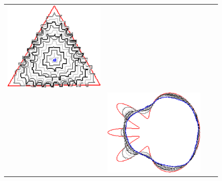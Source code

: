 \begin{figure}
\begin{tabular}{p{2.5em}ccc}
\includegraphics[scale=0.24]{figures/chapter6/radius-effect/triangle/improve/len_pen0.5/radius-9/summary.pdf} \\[2em]
& \includegraphics[scale=0.24]{figures/chapter6/radius-effect/flower/improve/len_pen0.5/radius-3/summary.pdf} &

\end{tabular}
\end{figure}
